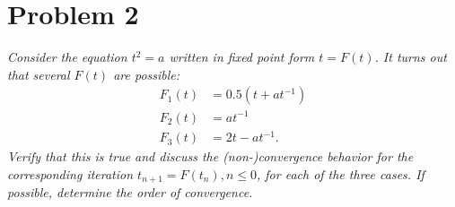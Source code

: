 \section{Problem 2}
\textit{Consider the equation $t^2 = a$ written in fixed point form $t = F(t)$. It turns out that several $F(t)$ are possible:}
\begin{align*}
    F_1(t) &= 0.5(t + at^{-1}) \\
    F_2(t) &= at^{-1} \\
    F_3(t) &= 2t - at^{-1}.
\end{align*}
\textit{Verify that this is true and discuss the (non-)convergence behavior for the corresponding iteration $t_{n+1} = F(t_n), n \le 0$, for each of the three cases. If possible, determine the order of convergence.}
